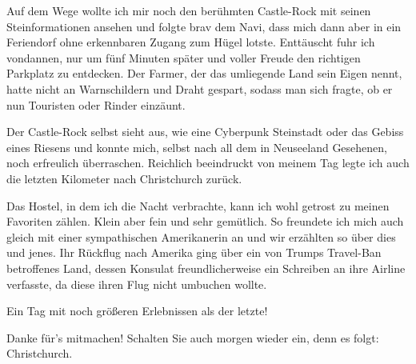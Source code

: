 Auf dem Wege wollte ich mir noch den berühmten Castle-Rock mit seinen
Steinformationen ansehen und folgte brav dem Navi, dass mich dann aber
in ein Feriendorf ohne erkennbaren Zugang zum Hügel lotste. Enttäuscht
fuhr ich vondannen, nur um fünf Minuten später und voller Freude den
richtigen Parkplatz zu entdecken. Der Farmer, der das umliegende Land
sein Eigen nennt, hatte nicht an Warnschildern und Draht gespart, sodass
man sich fragte, ob er nun Touristen oder Rinder einzäunt.

Der Castle-Rock selbst sieht aus, wie eine Cyberpunk Steinstadt oder das
Gebiss eines Riesens und konnte mich, selbst nach all dem in Neuseeland
Gesehenen, noch erfreulich überraschen. Reichlich beeindruckt von meinem
Tag legte ich auch die letzten Kilometer nach Christchurch zurück.

Das Hostel, in dem ich die Nacht verbrachte, kann ich wohl getrost zu
meinen Favoriten zählen. Klein aber fein und sehr gemütlich. So
freundete ich mich auch gleich mit einer sympathischen Amerikanerin an
und wir erzählten so über dies und jenes. Ihr Rückflug nach Amerika ging
über ein von Trumps Travel-Ban betroffenes Land, dessen Konsulat
freundlicherweise ein Schreiben an ihre Airline verfasste, da diese
ihren Flug nicht umbuchen wollte.

Ein Tag mit noch größeren Erlebnissen als der letzte!

Danke für's mitmachen! Schalten Sie auch morgen wieder ein, denn es
folgt: Christchurch.
